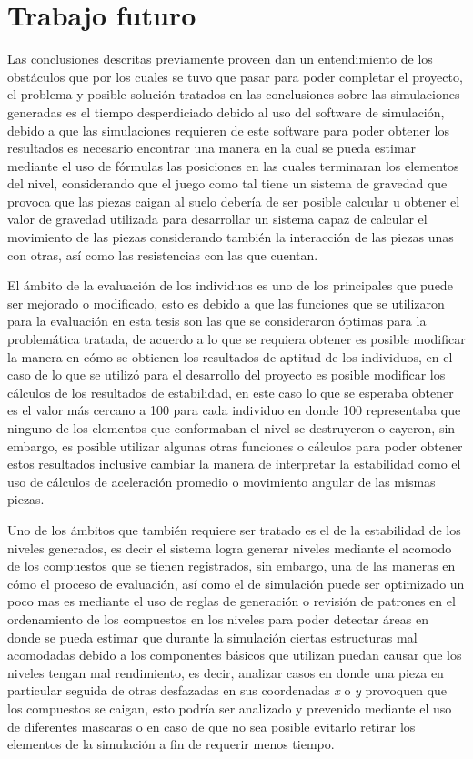 \section{Trabajo futuro}
\label{section:future-work}

Las conclusiones descritas previamente proveen dan un entendimiento de los
obstáculos que por los cuales se tuvo que pasar para poder completar el
proyecto, el problema y posible solución tratados en las conclusiones sobre las
simulaciones generadas es el tiempo desperdiciado debido al uso del software de
simulación, debido a que las simulaciones requieren de este software para poder
obtener los resultados es necesario encontrar una manera en la cual se pueda
estimar mediante el uso de fórmulas las posiciones en las cuales terminaran los
elementos del nivel, considerando que el juego como tal tiene un sistema de
gravedad que provoca que las piezas caigan al suelo debería de ser posible
calcular u obtener el valor de gravedad utilizada para desarrollar un sistema
capaz de calcular el movimiento de las piezas considerando también la
interacción de las piezas unas con otras, así como las resistencias con las que
cuentan.

El ámbito de la evaluación de los individuos es uno de los principales que puede
ser mejorado o modificado, esto es debido a que las funciones que se utilizaron
para la evaluación en esta tesis son las que se consideraron óptimas para la
problemática tratada, de acuerdo a lo que se requiera obtener es posible
modificar la manera en cómo se obtienen los resultados de aptitud de los
individuos, en el caso de lo que se utilizó para el desarrollo del proyecto es
posible modificar los cálculos de los resultados de estabilidad, en este caso lo
que se esperaba obtener es el valor más cercano a 100 para cada individuo en
donde 100 representaba que ninguno de los elementos que conformaban el nivel se
destruyeron o cayeron, sin embargo, es posible utilizar algunas otras funciones o
cálculos para poder obtener estos resultados inclusive cambiar la manera de
interpretar la estabilidad como el uso de cálculos de aceleración promedio o
movimiento angular de las mismas piezas.

Uno de los ámbitos que también requiere ser tratado es el de la estabilidad de
los niveles generados, es decir el sistema logra generar niveles mediante el
acomodo de los compuestos que se tienen registrados, sin embargo, una de las
maneras en cómo el proceso de evaluación, así como el de simulación puede ser
optimizado un poco mas es mediante el uso de reglas de generación o revisión de
patrones en el ordenamiento de los compuestos en los niveles para poder detectar
áreas en donde se pueda estimar que durante la simulación ciertas estructuras
mal acomodadas debido a los componentes básicos que utilizan puedan causar que
los niveles tengan mal rendimiento, es decir, analizar casos en donde una pieza
en particular seguida de otras desfazadas en sus coordenadas \textit{x} o
\textit{y} provoquen que los compuestos se caigan, esto podría ser analizado y
prevenido mediante el uso de diferentes mascaras o en caso de que no sea posible
evitarlo retirar los elementos de la simulación a fin de requerir menos tiempo.

